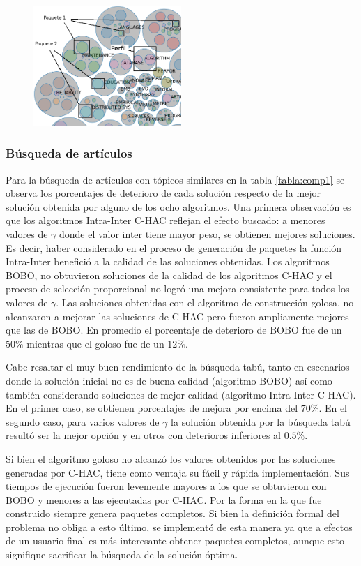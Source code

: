 \begin{figure}[H]
  \centering
    \includegraphics[width=0.5\textwidth]{img/explain-bubbles.png}
  \caption{}
  \label{res:img-explain-bubbles}
\end{figure}

\subsubsection{Búsqueda de artículos}
Para la búsqueda de artículos con tópicos similares en la tabla \ref{tabla:comp1} se observa los porcentajes de deterioro de cada solución respecto de la mejor solución obtenida por alguno de los ocho algoritmos. Una primera observación es que los algoritmos  Intra-Inter C-HAC reflejan el efecto buscado: a menores valores de $\gamma$ donde el valor inter tiene mayor peso, se obtienen mejores soluciones. Es decir, haber considerado en el proceso de generación de paquetes la función Intra-Inter benefició a la calidad de las soluciones obtenidas. Los algoritmos BOBO, no obtuvieron soluciones de la calidad de los algoritmos C-HAC y el proceso de selección proporcional no logró una mejora consistente para todos los valores de $\gamma$. Las soluciones obtenidas con el algoritmo de construcción golosa, no alcanzaron a mejorar las soluciones de C-HAC pero fueron ampliamente mejores que las de BOBO. En promedio el porcentaje de deterioro de BOBO fue de un $50\%$ mientras que el goloso fue de un $12\%$. 

Cabe resaltar el muy buen rendimiento de la búsqueda tabú, tanto en escenarios donde la solución inicial no es de buena calidad (algoritmo BOBO) así como también considerando soluciones de mejor calidad (algoritmo Intra-Inter C-HAC). En el primer caso, se obtienen porcentajes de mejora por encima del $70\%$. En el segundo caso, para varios valores de $\gamma$ la solución obtenida por la búsqueda tabú resultó ser la mejor opción y en otros con deterioros inferiores al $0.5\%$.

Si bien el algoritmo goloso no alcanzó los valores obtenidos por las soluciones generadas por C-HAC, tiene como ventaja su fácil y rápida implementación. Sus tiempos de ejecución fueron levemente mayores a los que se obtuvieron con BOBO y menores a las ejecutadas por C-HAC. Por la forma en la que fue construido siempre genera paquetes completos. Si bien la definición formal del problema no obliga a esto último, se implementó de esta manera ya que a efectos de un usuario final es más interesante obtener paquetes completos, aunque esto signifique sacrificar la búsqueda de la solución óptima.

